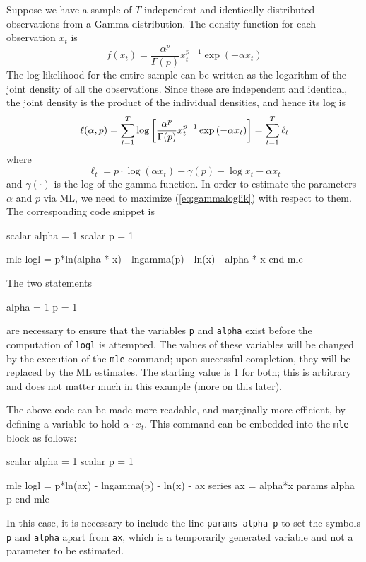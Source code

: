 Suppose we have a sample of $T$ independent and identically
distributed observations from a Gamma distribution. The density
function for each observation $x_t$ is
\begin{equation}
  \label{eq:gammadens}
  f(x_t) = \frac{\alpha^p}{\Gamma(p)} x_t^{p-1} \exp\left({-\alpha
      x_t}\right)
\end{equation}
The log-likelihood for the entire sample can be written as the
logarithm of the joint density of all the observations. Since these
are independent and identical, the joint density is the product of the
individual densities, and hence its log is
\begin{equation}
  \label{eq:gammaloglik}
  \ell(\alpha, p) = \sum_{t=1}^T \log \left[ \frac{\alpha^p}{\Gamma(p)} x_t^{p-1} \exp\left({-\alpha
      x_t}\right) \right] = 
      \sum_{t=1}^T \ell_t
\end{equation}
where 
\[
  \ell_t = p \cdot \log (\alpha x_t) - \gamma(p) - \log x_t - \alpha x_t
\]
and $\gamma(\cdot)$ is the log of the gamma function.  In order to
estimate the parameters $\alpha$ and $p$ via ML, we need to maximize
(\ref{eq:gammaloglik}) with respect to them. The corresponding
 code snippet is

\begin{code}
    scalar alpha = 1
    scalar p = 1

    mle logl =  p*ln(alpha * x) - lngamma(p) - ln(x) - alpha * x 
    end mle 
\end{code}

The two statements

\begin{code}
    alpha = 1
    p = 1
\end{code}

are necessary to ensure that the variables \texttt{p} and
\texttt{alpha} exist before the computation of \texttt{logl} is
attempted. The values of these variables will be changed by the
execution of the \texttt{mle} command; upon successful completion,
they will be replaced by the ML estimates. The starting value is 1 for
both; this is arbitrary and does not matter much in this example (more
on this later).

The above code can be made more readable, and marginally more
efficient, by defining a variable to hold $\alpha \cdot x_t$. This
command can be embedded into the \texttt{mle} block as follows:
\begin{code}
    scalar alpha = 1
    scalar p = 1

    mle logl =  p*ln(ax) - lngamma(p) - ln(x) - ax 
    series ax = alpha*x
    params alpha p
    end mle 
\end{code}
In this case, it is necessary to include the line \texttt{params alpha
  p} to set the symbols \texttt{p} and \texttt{alpha} apart from
\texttt{ax}, which is a temporarily generated variable and not a
parameter to be estimated.

